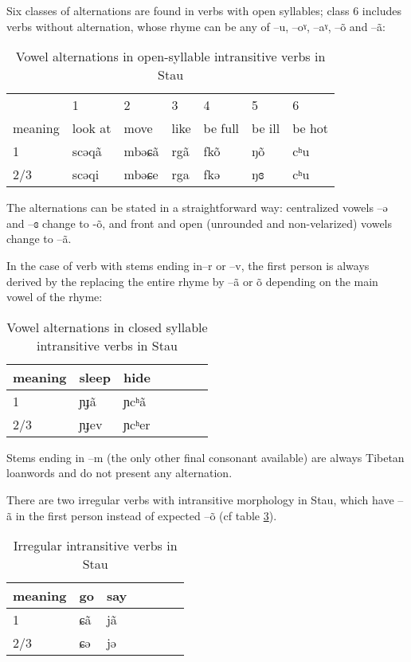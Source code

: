 \documentclass[oldfontcommands,twoside,usletter,12pt]{memoir}
\newcommand{\ipa}[1]{{\phon #1}} %
\begin{document}
 
Six classes of alternations are found in verbs with open syllables; class 6 includes verbs without alternation, whose rhyme can be any of --\ipa{u}, --\ipa{oˠ}, --\ipa{aˠ}, --\ipa{õ} and --\ipa{ã}:

\begin{table}[H]
 \label{tab:open.intr} \centering
\begin{tabular}{llll|ll|l}
\toprule
&1&2&3&4&5&6 \\
meaning &	look at   &  	move   &  	like&  	be full     &  	 	be ill      &  	be hot       \\  
\midrule
1&	\ipa{scəqã} & 	\ipa{mbəɕã} & \ipa{rgã} &	\ipa{fkõ} & 	  	\ipa{ŋõ} & 	   	\ipa{cʰu}   \\ 
2/3&	\ipa{scəqi} & 	\ipa{mbəɕe} & \ipa{rga} & 	\ipa{fkə} & 	  	\ipa{ŋɞ} & 	 	\ipa{cʰu}  \\ 
\bottomrule
\end{tabular}
\caption{Vowel alternations in open-syllable intransitive verbs in Stau}  
\end{table}

The alternations can be stated in a straightforward way: centralized vowels  --\ipa{ə} and  --\ipa{ɞ} change to -\ipa{õ}, and front and open (unrounded and non-velarized) vowels change to --\ipa{ã}.

In the case of verb with stems ending in--\ipa{r} or --\ipa{v}, the first person is always derived by the replacing the entire rhyme by --\ipa{ã} or \ipa{õ} depending on the main vowel of the rhyme:
\begin{table}[H]
\centering
\begin{tabular}{llll|ll|l}
\toprule
meaning &	sleep   &  	hide   \\  
\midrule
1&	\ipa{ɲɟã} & 	\ipa{ɲcʰã} \\ 
2/3&	\ipa{ɲɟev} & 	\ipa{ɲcʰer} \\ 
\bottomrule
\end{tabular}
\caption{Vowel alternations in closed syllable intransitive verbs in Stau} \label{tab:close.intr}
\end{table}

Stems ending in --\ipa{m} (the only other final consonant available) are always Tibetan loanwords and do not present any alternation.


There are two irregular verbs with intransitive morphology in Stau, which have \ipa{--ã} in the first person instead of expected \ipa{--õ} (cf table \ref{tab:irrintr}). 

\begin{table}[H]
\centering 
\begin{tabular}{lllllll}
\toprule
meaning &	go     & say \\  
\midrule
1&	\ipa{ɕã}  	 &\ipa{jã}\\ 
2/3&	\ipa{ɕə} & 	\ipa{jə} &\\ 
\bottomrule
\end{tabular}
\caption{Irregular intransitive verbs in Stau}  \label{tab:irrintr} 
\end{table}
\end{document}
